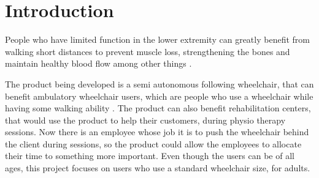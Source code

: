\chapter{Introduction\label{cha:introduction}}

 
People who have limited function in the lower extremity can greatly benefit from walking short distances to prevent muscle loss, strengthening the bones and maintain healthy blood flow among other things \cite{services_walking_2023}. 
\bigskip

The product being developed is a semi autonomous following wheelchair, that can benefit ambulatory wheelchair users, which are people who use a wheelchair while having some walking ability \cite{tyler_ambulatory_2020}. 
The product can also benefit rehabilitation centers, that would use the product to help their customers, during physio therapy sessions. 
Now there is an employee whose job it is to push the wheelchair behind the client during sessions, so the product could allow the employees to allocate their time to something more important. 
Even though the users can be of all ages, this project focuses on users who use a standard wheelchair size, for adults. 














